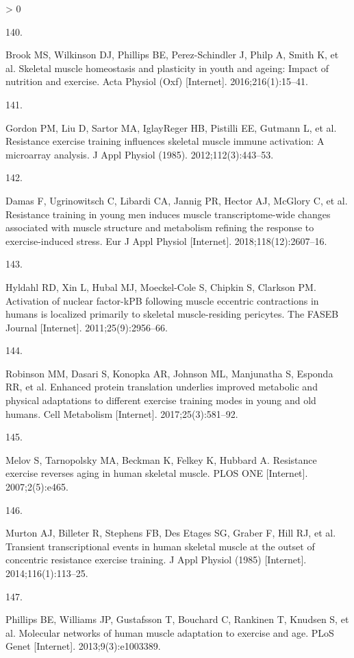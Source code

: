 \documentclass[twoside,10pt]{gihclass} %
\newlength{\cslhangindent}
\newlength{\csllabelwidth}
\newenvironment{CSLReferences}[3] %
 {%
  \setlength{\parindent}{0pt}
  \ifodd #1 \everypar{\setlength{\hangindent}{\cslhangindent}}\ignorespaces\fi
  \ifnum #2 > 0
  \setlength{\parskip}{#2\baselineskip}
  \fi
 }%
 {}
\newcommand{\CSLLeftMargin}[1]{\parbox[t]{\maxof{\widthof{#1}}{\csllabelwidth}}{#1}}
\newcommand{\CSLRightInline}[1]{\parbox[t]{\linewidth}{#1}}
\begin{document}
\begin{CSLReferences}{0}{0}
\leavevmode\hypertarget{ref-RN1966}{}%
\CSLLeftMargin{140. }
\CSLRightInline{Brook MS, Wilkinson DJ, Phillips BE, Perez-Schindler J, Philp A, Smith K, et al. Skeletal muscle homeostasis and plasticity in youth and ageing: Impact of nutrition and exercise. Acta Physiol (Oxf) {[}Internet{]}. 2016;216(1):15--41. }

\leavevmode\hypertarget{ref-RN1825}{}%
\CSLLeftMargin{141. }
\CSLRightInline{Gordon PM, Liu D, Sartor MA, IglayReger HB, Pistilli EE, Gutmann L, et al. Resistance exercise training influences skeletal muscle immune activation: A microarray analysis. J Appl Physiol (1985). 2012;112(3):443--53. }

\leavevmode\hypertarget{ref-RN2298}{}%
\CSLLeftMargin{142. }
\CSLRightInline{Damas F, Ugrinowitsch C, Libardi CA, Jannig PR, Hector AJ, McGlory C, et al. Resistance training in young men induces muscle transcriptome-wide changes associated with muscle structure and metabolism refining the response to exercise-induced stress. Eur J Appl Physiol {[}Internet{]}. 2018;118(12):2607--16. }

\leavevmode\hypertarget{ref-RN2408}{}%
\CSLLeftMargin{143. }
\CSLRightInline{Hyldahl RD, Xin L, Hubal MJ, Moeckel-Cole S, Chipkin S, Clarkson PM. Activation of nuclear factor-kPB following muscle eccentric contractions in humans is localized primarily to skeletal muscle-residing pericytes. The FASEB Journal {[}Internet{]}. 2011;25(9):2956--66. }

\leavevmode\hypertarget{ref-RN2400}{}%
\CSLLeftMargin{144. }
\CSLRightInline{Robinson MM, Dasari S, Konopka AR, Johnson ML, Manjunatha S, Esponda RR, et al. Enhanced protein translation underlies improved metabolic and physical adaptations to different exercise training modes in young and old humans. Cell Metabolism {[}Internet{]}. 2017;25(3):581--92. }

\leavevmode\hypertarget{ref-RN2397}{}%
\CSLLeftMargin{145. }
\CSLRightInline{Melov S, Tarnopolsky MA, Beckman K, Felkey K, Hubbard A. Resistance exercise reverses aging in human skeletal muscle. PLOS ONE {[}Internet{]}. 2007;2(5):e465. }

\leavevmode\hypertarget{ref-RN2299}{}%
\CSLLeftMargin{146. }
\CSLRightInline{Murton AJ, Billeter R, Stephens FB, Des Etages SG, Graber F, Hill RJ, et al. Transient transcriptional events in human skeletal muscle at the outset of concentric resistance exercise training. J Appl Physiol (1985) {[}Internet{]}. 2014;116(1):113--25. }

\leavevmode\hypertarget{ref-RN753}{}%
\CSLLeftMargin{147. }
\CSLRightInline{Phillips BE, Williams JP, Gustafsson T, Bouchard C, Rankinen T, Knudsen S, et al. Molecular networks of human muscle adaptation to exercise and age. PLoS Genet {[}Internet{]}. 2013;9(3):e1003389. }


\end{CSLReferences}
\end{document}

